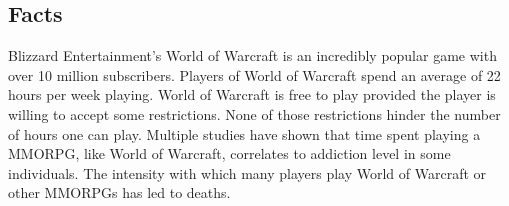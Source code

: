 \documentclass[11pt]{article}
\begin{document}
\newpage



\begin{multicols}{2}
\setcounter{page}{1}

\section{Facts}

Blizzard Entertainment's World of Warcraft is an incredibly popular game with over 10 million subscribers. \cite{WoWPlayerCount} Players of World of Warcraft spend an average of 22 hours per week playing. \cite{PlayerMotivations} World of Warcraft is free to play provided the player is willing to accept some restrictions. None of those restrictions hinder the number of hours one can play. \cite{StarterEditionFAQ} Multiple studies have shown that time spent playing a MMORPG, like World of Warcraft, correlates to addiction level in some individuals. \cite{ProblemUsageAmongHighlyEngagedPlayers}\cite{JustAComputerGameRight} The intensity with which many players play World of Warcraft or other MMORPGs has led to deaths. \cite{SnowlyDeath}\cite{ShawnDeath}




\end{multicols}
\end{document}
